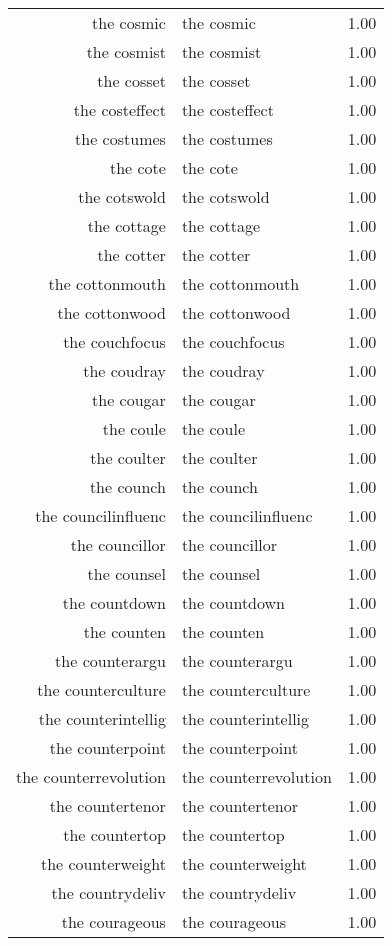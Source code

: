 \begin{table}[ht]
\begin{tabular}{rlr}
  the cosmic & the cosmic & 1.00 \\ 
  the cosmist & the cosmist & 1.00 \\ 
  the cosset & the cosset & 1.00 \\ 
  the costeffect & the costeffect & 1.00 \\ 
  the costumes & the costumes & 1.00 \\ 
  the cote & the cote & 1.00 \\ 
  the cotswold & the cotswold & 1.00 \\ 
  the cottage & the cottage & 1.00 \\ 
  the cotter & the cotter & 1.00 \\ 
  the cottonmouth & the cottonmouth & 1.00 \\ 
  the cottonwood & the cottonwood & 1.00 \\ 
  the couchfocus & the couchfocus & 1.00 \\ 
  the coudray & the coudray & 1.00 \\ 
  the cougar & the cougar & 1.00 \\ 
  the coule & the coule & 1.00 \\ 
  the coulter & the coulter & 1.00 \\ 
  the counch & the counch & 1.00 \\ 
  the councilinfluenc & the councilinfluenc & 1.00 \\ 
  the councillor & the councillor & 1.00 \\ 
  the counsel & the counsel & 1.00 \\ 
  the countdown & the countdown & 1.00 \\ 
  the counten & the counten & 1.00 \\ 
  the counterargu & the counterargu & 1.00 \\ 
  the counterculture & the counterculture & 1.00 \\ 
  the counterintellig & the counterintellig & 1.00 \\ 
  the counterpoint & the counterpoint & 1.00 \\ 
  the counterrevolution & the counterrevolution & 1.00 \\ 
  the countertenor & the countertenor & 1.00 \\ 
  the countertop & the countertop & 1.00 \\ 
  the counterweight & the counterweight & 1.00 \\ 
  the countrydeliv & the countrydeliv & 1.00 \\ 
  the courageous & the courageous & 1.00 \\ 

\end{tabular}
\end{table}
